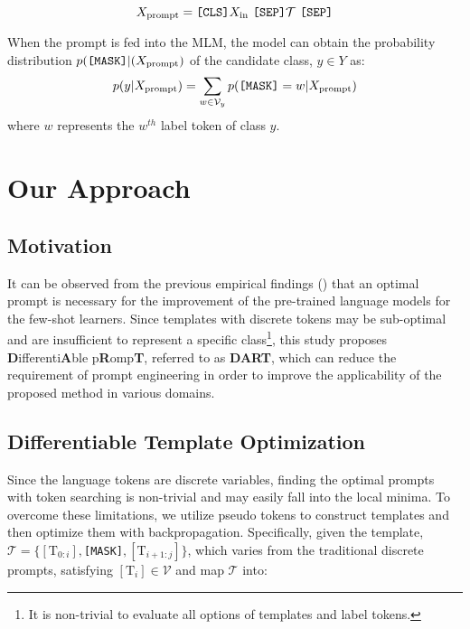 \documentclass{article} \usepackage{iclr2022_conference,times}
\newcommand{\xinput}{{X}_{\mathrm{in}}}
\newcommand{\xprompt}{{X}_{\mathrm{prompt}}}
\newcommand{\template}{\mathcal{T}}
\newcommand{\labelset}{Y}
\newcommand{\cls}{\texttt{[CLS]}}
\newcommand{\sep}{\texttt{[SEP]}}
\newcommand{\mask}{\texttt{[MASK]}}
\begin{document}
\begin{equation}
    \xprompt = \text{\cls $\xinput$ \sep $\template$ \sep}
\end{equation}

When the prompt is fed into the MLM, the model can obtain the probability distribution  $p(\textrm{\tt[MASK]}|(\xprompt)$ of the candidate class, $y \in \labelset$ as:
\begin{equation}
\label{eqn:marginal-prob}
p(y | \xprompt)=\sum_{w \in \mathcal{V}_{y}} p(\textrm{\tt[MASK]} = w | \xprompt)
\end{equation}
where ${w}$ represents the $w^{th}$ label token of class $y$. 



\section{Our Approach}

\subsection{Motivation}

It can be observed from the previous empirical findings (\cite{DBLP:journals/corr/abs-2012-15723,DBLP:journals/corr/abs-2103-08493}) that an optimal prompt is necessary for the improvement of the pre-trained language models for the few-shot learners. 
Since templates with discrete tokens may be sub-optimal and are insufficient to represent a specific class\footnote{It is non-trivial to evaluate all options of templates and label tokens.}, this study proposes \textbf{D}ifferenti\textbf{A}ble p\textbf{R}omp\textbf{T}, referred to as {\textbf{DART}}, which can reduce the requirement of prompt engineering in order to improve the applicability of the proposed method in various domains.

\subsection{Differentiable Template Optimization}
\label{optsec1}

Since the language tokens are discrete variables, finding the optimal prompts with token searching is non-trivial and may easily fall into the local minima.
To overcome these limitations, we utilize pseudo tokens to construct templates and then optimize them with backpropagation.
Specifically, given the template,
$\mathcal{T}=\{[\mathrm{T}_{0:i}], $\mask$,[\mathrm{T}_{i+1:j}]\}$, which varies from  the traditional discrete prompts, satisfying $[\mathrm{T}_i]\in\mathcal{V}$ and map $\mathcal{T}$ into:
\end{document}
